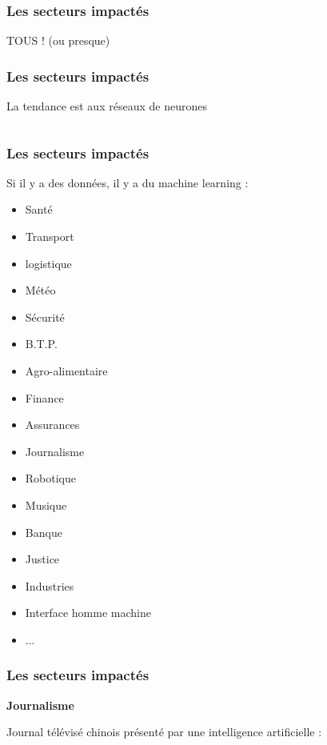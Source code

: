 \begin{frame}
  \frametitle{Les secteurs impactés}
  \begin{center}
    \huge TOUS ! (ou presque)
  \end{center}
\end{frame}

\begin{frame}
  \frametitle{Les secteurs impactés}
  \begin{center}
    La tendance est aux réseaux de neurones
  \end{center}
  $\;$ \\
  \begin{minipage}[c]{0.49\linewidth}
  \end{minipage}\hfill
  \begin{minipage}[c]{0.49\linewidth}
  \end{minipage}\hfill
\end{frame}

\begin{frame}
  \frametitle{Les secteurs impactés}
  Si il y a des données, il y a du machine learning :
  \newline
  \newline
  \begin{minipage}[c]{0.49\linewidth}
    \begin{itemize}
    \item Santé 
    \item Transport
    \item logistique
    \item Météo
    \item Sécurité
    \item B.T.P.
    \item Agro-alimentaire    
    \item Finance
    \item Assurances
    \end{itemize}
  \end{minipage}\hfill
  \begin{minipage}[c]{0.49\linewidth}
    \begin{itemize}
    \item Journalisme
    \item Robotique
    \item Musique
    \item Banque
    \item Justice
    \item Industries
    \item Interface homme machine
    \item ...
    \end{itemize}
  \end{minipage}\hfill
\end{frame}

\begin{frame}
  \frametitle{Les secteurs impactés}
  \textbf{Journalisme}
  
  Journal télévisé chinois présenté par une intelligence artificielle :
\end{frame}
